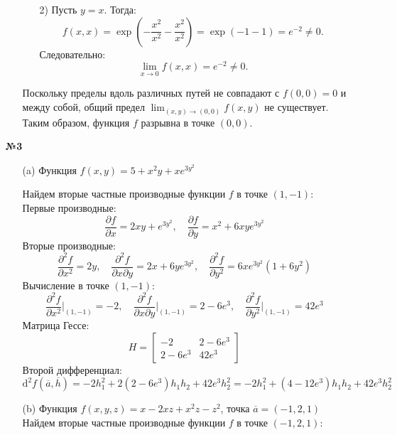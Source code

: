\documentclass[a4paper]{article}
\begin{document}
\begin{enumerate}
\begin{enumerate}
\begin{enumerate}
            \item[2)] Пусть $y = x$. Тогда:
                \[
                f(x, x) = \exp\left(-\frac{x^2}{x^2} - \frac{x^2}{x^2}\right) = \exp(-1 - 1) = e^{-2} \neq 0.
                \]
                Следовательно:
                \[
                \lim_{x \to 0} f(x, x) = e^{-2} \neq 0.
                \]
        \end{enumerate}

        Поскольку пределы вдоль различных путей не совпадают с $f(0,0) = 0$ и между собой, общий предел $\lim_{(x,y) \to (0,0)} f(x,y)$ не существует. Таким образом, функция $f$ разрывна в точке $(0,0)$.\\

    \end{enumerate}
    

    \item[\textbf{№3}]
    \begin{enumerate}
        \item[(a)]Функция \( f(x, y) = 5 + x^2 y + x e^{3y^2}\)

        Найдем вторые частные производные функции \( f \) в точке \((1, -1)\):
        Первые производные:
        \[
        \frac{\partial f}{\partial x} = 2xy + e^{3y^2}, \quad \frac{\partial f}{\partial y} = x^2 + 6xy e^{3y^2}
        \]
        Вторые производные:
        \[
        \frac{\partial^2 f}{\partial x^2} = 2y, \quad \frac{\partial^2 f}{\partial x \partial y} = 2x + 6y e^{3y^2}, \quad \frac{\partial^2 f}{\partial y^2} = 6x e^{3y^2}(1 + 6y^2)
        \]
        Вычисление в точке \((1, -1)\):
        \[
        \frac{\partial^2 f}{\partial x^2}\bigg|_{(1, -1)} = -2, \quad \frac{\partial^2 f}{\partial x \partial y}\bigg|_{(1, -1)} = 2 - 6e^3, \quad \frac{\partial^2 f}{\partial y^2}\bigg|_{(1, -1)} = 42e^3
        \]    
        Матрица Гессе:
        \[
        H = \begin{bmatrix}
        -2 & 2 - 6e^3 \\
        2 - 6e^3 & 42e^3
        \end{bmatrix}
        \] 
        Второй дифференциал:
        \[
        \mathrm{d}^2 f(\overline{a}, \overline{h}) = 
        -2 h_1^2 + 2(2 - 6e^3) h_1 h_2 + 42e^3 h_2^2 = 
        -2 h_1^2 + (4 - 12e^3) h_1 h_2 + 42e^3 h_2^2
        \]

        \item[(b)]Функция \( f(x, y, z) = x - 2xz + x^2z - z^2 \), точка \(\overline{a} = (-1, 2, 1)\)
        Найдем вторые частные производные функции \( f \) в точке \((-1, 2, 1)\):
        

\end{enumerate}
\end{enumerate}
\end{document}
